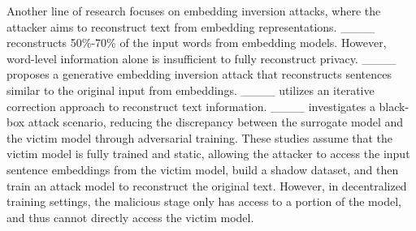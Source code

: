 
Another line of research focuses on embedding inversion attacks, where the attacker aims to reconstruct text from embedding representations. ____ reconstructs 50\%-70\% of the input words from embedding models. However, word-level information alone is insufficient to fully reconstruct privacy. ____ proposes a generative embedding inversion attack that reconstructs sentences similar to the original input from embeddings. ____ utilizes an iterative correction approach to reconstruct text information. ____ investigates a black-box attack scenario, reducing the discrepancy between the surrogate model and the victim model through adversarial training. These studies assume that the victim model is fully trained and static, allowing the attacker to access the input sentence embeddings from the victim model, build a shadow dataset, and then train an attack model to reconstruct the original text. However, in decentralized training settings, the malicious stage only has access to a portion of the model, and thus cannot directly access the victim model.

